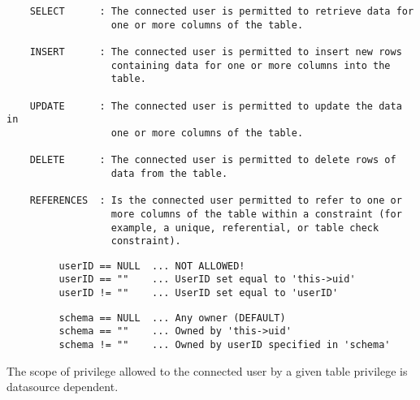 \begin{verbatim}
    SELECT      : The connected user is permitted to retrieve data for
                  one or more columns of the table.

    INSERT      : The connected user is permitted to insert new rows
                  containing data for one or more columns into the
                  table.

    UPDATE      : The connected user is permitted to update the data in
                  one or more columns of the table.

    DELETE      : The connected user is permitted to delete rows of
                  data from the table.

    REFERENCES  : Is the connected user permitted to refer to one or
                  more columns of the table within a constraint (for
                  example, a unique, referential, or table check
                  constraint).
\end{verbatim}


\begin{verbatim}
         userID == NULL  ... NOT ALLOWED!
         userID == ""    ... UserID set equal to 'this->uid'
         userID != ""    ... UserID set equal to 'userID'
\end{verbatim}


\begin{verbatim}
         schema == NULL  ... Any owner (DEFAULT)
         schema == ""    ... Owned by 'this->uid'
         schema != ""    ... Owned by userID specified in 'schema'
\end{verbatim}



The scope of privilege allowed to the connected user by a given table
privilege is datasource dependent.


